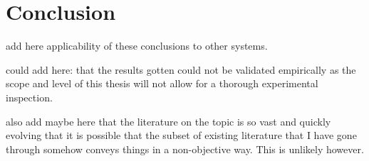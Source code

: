 \chapter{Conclusion}

add here applicability of these conclusions to other systems.

could add here: that the results gotten could not be validated empirically as the scope and level of this thesis will not allow for a thorough experimental inspection.

also add maybe here that the literature on the topic is so vast and quickly evolving that it is possible that the subset of existing literature that I have gone through somehow conveys things in a non-objective way. This is unlikely however.

